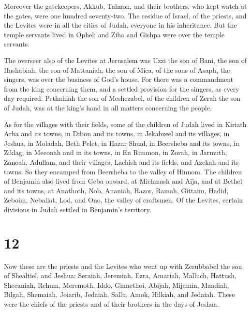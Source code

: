  Moreover the gatekeepers, Akkub, Talmon, and their
brothers, who kept watch at the gates, were one hundred seventy-two.
 The residue of Israel, of the priests, and the Levites
were in all the cities of Judah, everyone in his inheritance.
 But the temple servants lived in Ophel; and Ziha and
Gishpa were over the temple servants.

 The overseer also of the Levites at Jerusalem was Uzzi the
son of Bani, the son of Hashabiah, the son of Mattaniah, the son of
Mica, of the sons of Asaph, the singers, was over the business of God's
house.  For there was a commandment from the king
concerning them, and a settled provision for the singers, as every day
required.  Pethahiah the son of Meshezabel, of the children
of Zerah the son of Judah, was at the king's hand in all matters
concerning the people.

 As for the villages with their fields, some of the
children of Judah lived in Kiriath Arba and its towns, in Dibon and its
towns, in Jekabzeel and its villages,  in Jeshua, in
Moladah, Beth Pelet,  in Hazar Shual, in Beersheba and its
towns,  in Ziklag, in Meconah and in its towns,
 in En Rimmon, in Zorah, in Jarmuth,  Zanoah,
Adullam, and their villages, Lachish and its fields, and Azekah and its
towns. So they encamped from Beersheba to the valley of Hinnom.
 The children of Benjamin also lived from Geba onward, at
Michmash and Aija, and at Bethel and its towns,  at
Anathoth, Nob, Ananiah,  Hazor, Ramah, Gittaim,
 Hadid, Zeboim, Neballat,  Lod, and Ono, the
valley of craftsmen.  Of the Levites, certain divisions in
Judah settled in Benjamin's territory.

\hypertarget{section-11}{%
\section{12}\label{section-11}}

 Now these are the priests and the Levites who went up with
Zerubbabel the son of Shealtiel, and Jeshua: Seraiah, Jeremiah, Ezra,
 Amariah, Malluch, Hattush,  Shecaniah, Rehum,
Meremoth,  Iddo, Ginnethoi, Abijah,  Mijamin,
Maadiah, Bilgah,  Shemaiah, Joiarib, Jedaiah, 
Sallu, Amok, Hilkiah, and Jedaiah. These were the chiefs of the priests
and of their brothers in the days of Jeshua.

